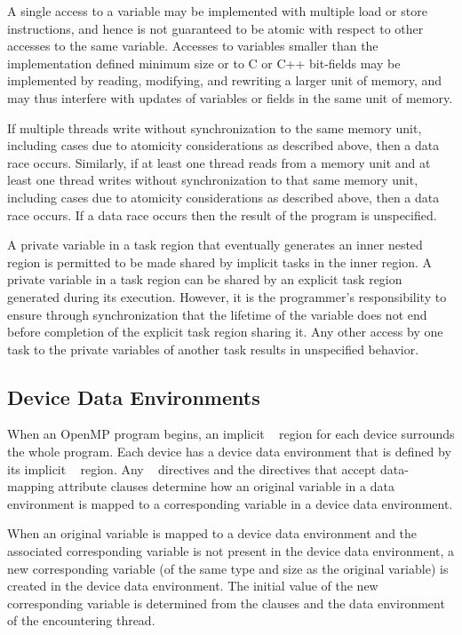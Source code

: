 A single access to a variable may be implemented with multiple load or store
instructions, and hence is not guaranteed to be atomic with respect to other accesses to
the same variable. Accesses to variables smaller than the implementation defined
minimum size or to C or C++ bit-fields may be implemented by reading, modifying, and
rewriting a larger unit of memory, and may thus interfere with updates of variables or
fields in the same unit of memory.

If multiple threads write without synchronization to the same memory unit, including
cases due to atomicity considerations as described above, then a data race occurs.
Similarly, if at least one thread reads from a memory unit and at least one thread writes
without synchronization to that same memory unit, including cases due to atomicity
considerations as described above, then a data race occurs. If a data race occurs then the
result of the program is unspecified.

A private variable in a task region that eventually generates an inner nested 
region is permitted to be made shared by implicit tasks in the inner  region.
A private variable in a task region can be shared by an explicit task region generated
during its execution. However, it is the programmer's responsibility to ensure through
synchronization that the lifetime of the variable does not end before completion of the
explicit task region sharing it. Any other access by one task to the
private variables of another task results in unspecified behavior.




\subsection{Device Data Environments}
\label{subsec:Device Data Environments}
When an OpenMP program begins, an implicit ~ region for each device surrounds the whole program. Each device has a device data environment that is defined by its implicit ~ region. Any ~ directives and the directives that accept data-mapping attribute clauses determine how an original variable in a data environment is mapped to a corresponding variable in a device data environment.

When an original variable is mapped to a device data environment and the associated corresponding variable is not present in the device data environment, a new corresponding variable (of the same type and size as the original variable) is created in the device data environment. The initial value of the new corresponding variable is determined from the clauses and the data environment of the encountering thread.

